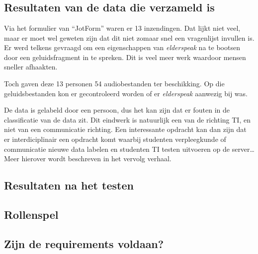 
\chapter{}
\label{ch:resultaten}

\section{Resultaten van de data die verzameld is}
Via het formulier van ``JotForm'' waren er 13 inzendingen. Dat lijkt niet veel, maar er moet wel geweten zijn dat dit niet zomaar snel een vragenlijst invullen is. Er werd telkens gevraagd om een eigenschappen van \textit{elderspeak} na te bootsen door een geluidsfragment in te spreken. Dit is veel meer werk waardoor mensen sneller afhaakten.

Toch gaven deze 13 personen 54 audiobestanden ter beschikking. Op die geluidsbestanden kon er gecontroleerd worden of er \textit{elderspeak} aanwezig bij was.

De data is gelabeld door een persoon, dus het kan zijn dat er fouten in de classificatie van de data zit. Dit eindwerk is natuurlijk een van de richting TI, en niet van een communicatie richting. Een interessante opdracht kan dan zijn dat er interdiciplinair een opdracht komt waarbij studenten verpleegkunde of communicatie nieuwe data labelen en studenten TI testen uitvoeren op de server\ldots Meer hierover wordt beschreven in het vervolg verhaal.

\section{Resultaten na het testen}

\section{Rollenspel}

\section{Zijn de requirements voldaan?}
